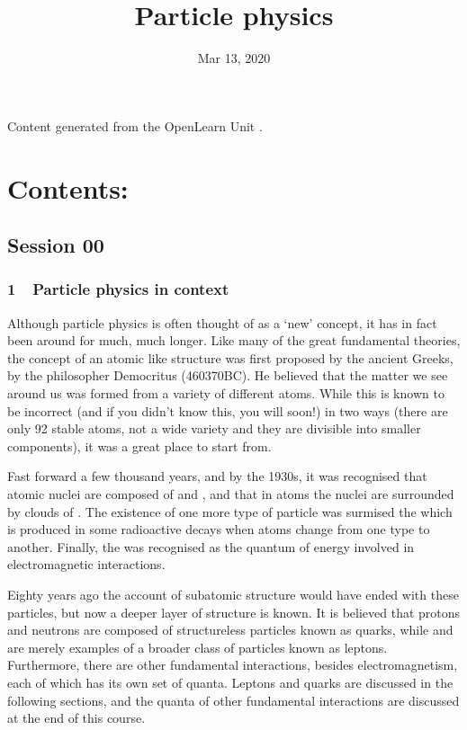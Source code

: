 \documentclass[letterpaper,10pt,english]{sphinxmanual}
\title{Particle physics}
\date{Mar 13, 2020}
\author{}
\begin{document}
\pagestyle{empty}
\sphinxmaketitle
\pagestyle{plain}
\sphinxtableofcontents
\pagestyle{normal}
\label{\detokenize{index::doc}}


Content generated from the OpenLearn Unit .


\chapter{Contents:}
\label{\detokenize{index:contents}}

\section{Session 00}
\label{\detokenize{index:session-00}}

\subsection{1  Particle physics in context}
\label{\detokenize{content/session_00/Part_00_01:1_xa0_xa0Particle-physics-in-context}}\label{\detokenize{content/session_00/Part_00_01::doc}}
Although particle physics is often thought of as a ‘new’ concept, it has in fact been around for much, much longer. Like many of the great fundamental theories, the concept of an atomic like structure was first proposed by the ancient Greeks, by the philosopher Democritus (460\textendash{}370BC). He believed that the matter we see around us was formed from a variety of different atoms. While this is known to be incorrect (and if you didn’t know this, you will soon!) in two ways (there are only 92 stable
atoms, not a wide variety and they are divisible into smaller components), it was a great place to start from.

Fast forward a few thousand years, and by the 1930s, it was recognised that atomic nuclei are composed of  and , and that in atoms the nuclei are surrounded by clouds of . The existence of one more type of particle was surmised \sphinxhyphen{} the  \sphinxhyphen{} which is produced in some radioactive decays when atoms change from one type to another. Finally, the  was recognised as the quantum of energy involved in electromagnetic interactions.

Eighty years ago the account of subatomic structure would have ended with these particles, but now a deeper layer of structure is known. It is believed that protons and neutrons are composed of structureless particles known as quarks, while  and  are merely examples of a broader class of particles known as leptons. Furthermore, there are other fundamental interactions, besides electromagnetism, each of which has its own set of quanta. Leptons and quarks are
discussed in the following sections, and the quanta of other fundamental interactions are discussed at the end of this course.
\end{document}
